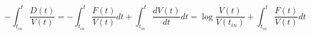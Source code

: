 \begin{equation}
-\int_{t_{in}}^t \frac{D(t)}{V(t)}=-\int_{t_{in}}^t \frac{F(t)}{V(t)} dt + \int_{t_{in}}^t \frac{dV(t)}{dt} dt = \log \frac{V(t)}{V(t_{in})}+ \int_{t_{in}}^t \frac{F(t)}{V(t)} dt
\end{equation}
